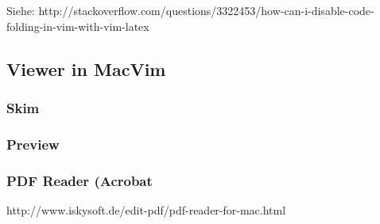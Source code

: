 \documentclass[a4paper,parskip=half,draft=true,DIV=15]{scrartcl}
\begin{document}
Siehe: http://stackoverflow.com/questions/3322453/how-can-i-disable-code-folding-in-vim-with-vim-latex

\subsection{Viewer in MacVim}

\subsubsection{Skim}

\subsubsection{Preview}

\subsubsection{PDF Reader (Acrobat}


http://www.iskysoft.de/edit-pdf/pdf-reader-for-mac.html


% 
% 
\end{document}
